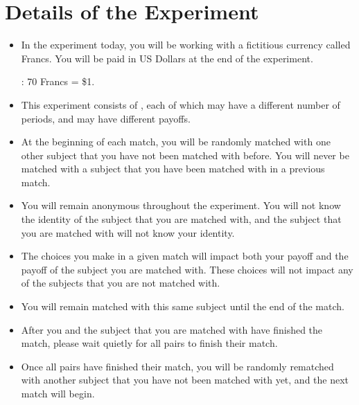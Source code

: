 \documentclass[11pt]{article}
\newcommand{\dblbkt}[1]{\ignorespaces}
\begin{document}
\section*{\dblbkt{3} Details of the Experiment} 
\begin{itemize} 
\item In the experiment today, you will be working with a fictitious currency called Francs. You will be paid in US Dollars at the end of the experiment.
\begin{center} 
\dblbkt{1}{\bf Exchange rate}: 70 Francs = \$1.
\end{center} 

\item  This experiment consists of \dblbkt{1}{\bf three matches}, each of which may have a different number of periods, and may have different payoffs.  
\item At the beginning of each match, \dblbkt{1} you will be randomly matched with one other subject that you have not been matched with before.  You will never be matched with a subject that you have been matched with in a previous match. 
\item You will remain \dblbkt{1} anonymous throughout the experiment.  You will not know the identity of the subject that you are matched with, and the subject that you are matched with will not know your identity.  
\item The choices you make in a given match will impact both your payoff and the payoff of the subject you are matched with.  These choices will not impact any of the subjects that you are not matched with.  
\item You will remain matched with this \dblbkt{1} same subject until the end of the match.  
\item After you and the subject that you are matched with have finished the match, please wait quietly for all pairs to finish their match.  
\item Once all pairs have finished their match, you will be \dblbkt{1} randomly rematched with another subject that you have not been matched with yet, and the next match will begin.  
\end{itemize}
\end{document}

